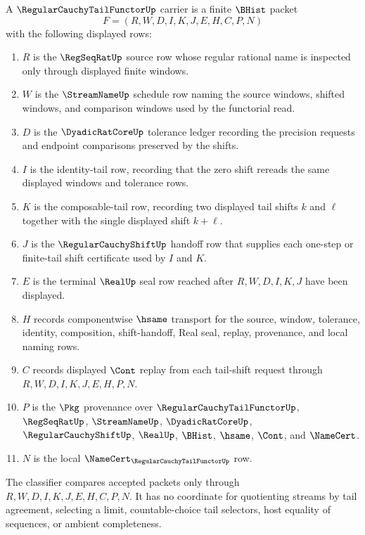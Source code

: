 \begin{definition}
\label{def:regular-cauchy-tail-functor-carrier}
A $\RegularCauchyTailFunctorUp$ carrier is a finite $\BHist$ packet
$$
F=(R,W,D,I,K,J,E,H,C,P,N)
$$
with the following displayed rows:
\begin{enumerate}
\item $R$ is the $\RegSeqRatUp$ source row whose regular rational name is inspected only through displayed finite windows.
\item $W$ is the $\StreamNameUp$ schedule row naming the source windows, shifted windows, and comparison windows used by the functorial read.
\item $D$ is the $\DyadicRatCoreUp$ tolerance ledger recording the precision requests and endpoint comparisons preserved by the shifts.
\item $I$ is the identity-tail row, recording that the zero shift rereads the same displayed windows and tolerance rows.
\item $K$ is the composable-tail row, recording two displayed tail shifts $k$ and $\ell$ together with the single displayed shift $k+\ell$.
\item $J$ is the $\RegularCauchyShiftUp$ handoff row that supplies each one-step or finite-tail shift certificate used by $I$ and $K$.
\item $E$ is the terminal $\RealUp$ seal row reached after $R,W,D,I,K,J$ have been displayed.
\item $H$ records componentwise $\hsame$ transport for the source, window, tolerance, identity, composition, shift-handoff, Real seal, replay, provenance, and local naming rows.
\item $C$ records displayed $\Cont$ replay from each tail-shift request through $R,W,D,I,K,J,E,H,P,N$.
\item $P$ is the $\Pkg$ provenance over $\RegularCauchyTailFunctorUp$, $\RegSeqRatUp$, $\StreamNameUp$, $\DyadicRatCoreUp$, $\RegularCauchyShiftUp$, $\RealUp$, $\BHist$, $\hsame$, $\Cont$, and $\NameCert$.
\item $N$ is the local $\NameCert_{\RegularCauchyTailFunctorUp}$ row.
\end{enumerate}
The classifier compares accepted packets only through $R,W,D,I,K,J,E,H,C,P,N$. It has no coordinate for quotienting streams by tail agreement, selecting a limit, countable-choice tail selectors, host equality of sequences, or ambient completeness.
\end{definition}

